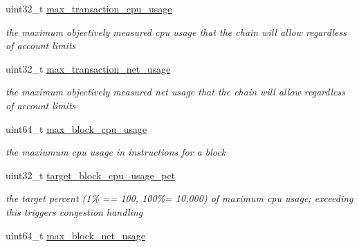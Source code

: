 \begin{DoxyCompactItemize}
uint32\+\_\+t \mbox{\hyperlink{structaacio_1_1chain_1_1chain__config_a52e9b18e37056d4b345f5138a0d3cd24}{max\+\_\+transaction\+\_\+cpu\+\_\+usage}}
\begin{DoxyCompactList}\small\item\em the maximum objectively measured cpu usage that the chain will allow regardless of account limits \end{DoxyCompactList}\item 
\mbox{\label{structaacio_1_1chain_1_1chain__config_ae8e64e06167a5a7db105c3852691415c}} 
uint32\+\_\+t \mbox{\hyperlink{structaacio_1_1chain_1_1chain__config_ae8e64e06167a5a7db105c3852691415c}{max\+\_\+transaction\+\_\+net\+\_\+usage}}
\begin{DoxyCompactList}\small\item\em the maximum objectively measured net usage that the chain will allow regardless of account limits \end{DoxyCompactList}\item 
\mbox{\label{structaacio_1_1chain_1_1chain__config_a497d6e8b9098fb4c0b6f0605cd3efec8}} 
uint64\+\_\+t \mbox{\hyperlink{structaacio_1_1chain_1_1chain__config_a497d6e8b9098fb4c0b6f0605cd3efec8}{max\+\_\+block\+\_\+cpu\+\_\+usage}}
\begin{DoxyCompactList}\small\item\em the maxiumum cpu usage in instructions for a block \end{DoxyCompactList}\item 
\mbox{\label{structaacio_1_1chain_1_1chain__config_a12a06aeeb68a6f4dd2a9e707f4d406fc}} 
uint32\+\_\+t \mbox{\hyperlink{structaacio_1_1chain_1_1chain__config_a12a06aeeb68a6f4dd2a9e707f4d406fc}{target\+\_\+block\+\_\+cpu\+\_\+usage\+\_\+pct}}
\begin{DoxyCompactList}\small\item\em the target percent (1\% == 100, 100\%= 10,000) of maximum cpu usage; exceeding this triggers congestion handling \end{DoxyCompactList}\item 
\mbox{\label{structaacio_1_1chain_1_1chain__config_a827a60e4296424f813f009a5f20909f2}} 
uint64\+\_\+t \mbox{\hyperlink{structaacio_1_1chain_1_1chain__config_a827a60e4296424f813f009a5f20909f2}{max\+\_\+block\+\_\+net\+\_\+usage}}

\end{DoxyCompactItemize}
